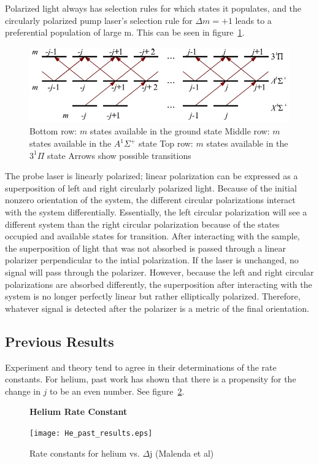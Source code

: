 \documentclass[letterpaper,titlepage,12pt]{article}
\begin{document}
Polarized light always has selection rules for which states it populates, and
the circularly polarized pump laser's selection rule for \(\Delta m=+1\) leads to
a preferential population of large m.  This can be seen in
figure~\ref{fig:m_potcurves}.
\begin{figure}[h]
    \centering
    \includegraphics[width=1\textwidth]{m_potcurves.jpg}
    \caption{Bottom row: \(m\) states available in the ground state
        Middle row: \(m\) states available in the \(A^1\Sigma^+\) state
        Top row: \(m\) states available in the \(3^1\Pi\) state
    Arrows show possible transitions}
\label{fig:m_potcurves}
\end{figure}

The probe laser is linearly polarized; linear polarization can be expressed as
a superposition of left and right circularly polarized light.  Because of the
initial nonzero orientation of the system, the different circular polarizations
interact with the system differentially.  Essentially, the left circular
polarization will see a different system than the right circular polarization
because of the states occupied and available states for transition.  After
interacting with the sample, the superposition of light that was not absorbed is passed through a linear
polarizer perpendicular to the intial polarization.  If the laser is unchanged,
no signal will pass through the polarizer.  However, because the left and right
circular polarizations are absorbed differently, the superposition after
interacting with the system is no longer perfectly linear but rather
elliptically polarized.  Therefore, whatever signal is detected after the
polarizer is a metric of the final orientation.

\newpage
\subsection{Previous Results}
Experiment and theory tend to agree in their determinations of the rate
constants.  For helium, past work has shown that there is a propensity for the
change in \(j\) to be an even number. See figure~\ref{fig:He_past_results}.
\begin{figure}[h]
    \centering
    \textbf{Helium Rate Constant}\par\medskip
    \texttt{[image: He\_past\_results.eps]}
    \caption{Rate constants for helium vs. \(\Delta\)j (Malenda et al)}
\label{fig:He_past_results}
\end{figure}
\end{document}
